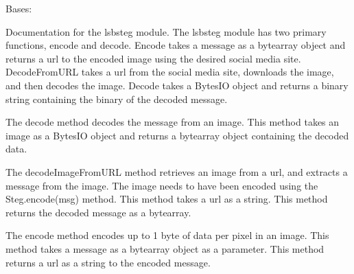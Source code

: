 \documentclass[letterpaper,12pt,openany,oneside]{sphinxmanual}
\begin{document}
\begin{fulllineitems}
\label{Image_Manipulation:Image_Manipulation.lsbsteg.Steg}
Bases: 

Documentation for the lsbsteg module.
The lsbsteg module has two primary functions, encode and decode.
Encode takes a message as a bytearray object and returns a url to the
encoded image using the desired social media site.
DecodeFromURL takes a url from the social media site, downloads the image,
and then decodes the image. Decode takes a BytesIO object and returns a
binary string containing the binary of the decoded message.

\begin{fulllineitems}
\label{Image_Manipulation:Image_Manipulation.lsbsteg.Steg.decode}
The decode method decodes the message from an image.
This method takes an image as a BytesIO object and returns a bytearray
object containing the decoded data.

\end{fulllineitems}


\begin{fulllineitems}
\label{Image_Manipulation:Image_Manipulation.lsbsteg.Steg.decodeImageFromURL}
The decodeImageFromURL method retrieves an image from a url,
and extracts a message from the image. The image needs to have
been encoded using the Steg.encode(msg) method.
This method takes a url as a string.
This method returns the decoded message as a bytearray.

\end{fulllineitems}


\begin{fulllineitems}
\label{Image_Manipulation:Image_Manipulation.lsbsteg.Steg.encode}
The encode method encodes up to 1 byte of data per pixel in an image.
This method takes a message as a bytearray object as a parameter.
This method returns a url as a string to the encoded message.


\end{fulllineitems}
\end{fulllineitems}
\end{document}
